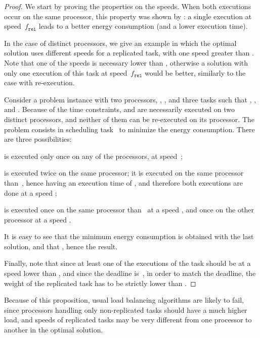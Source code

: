\documentclass[a4paper]{article}
\theoremstyle{plain}
\theoremstyle{definition}
\theoremstyle{remark}
\newcommand{\fr}{\ensuremath{f_{\texttt{rel}}}\xspace}
\begin{document}
\begin{proof}
  We start by proving the properties on the speeds.  
  When both executions occur on the same processor, this property was
  shown by \cite{rr7757}: a single execution at speed~\fr leads to a
  better energy consumption (and a lower execution time). 

  In the case of distinct processors, we give an example in which
  the optimal solution uses different speeds for a replicated task,
  with one speed greater than . Note that one
  of the speeds is necessary lower than ,
  otherwise a solution with only one execution of this task at
  speed~\fr would be better, similarly to the case with re-execution. 

  Consider a problem instance with two processors, ,
  , and three tasks such that , ,
  and .  Because of the time constraints,  and  are
  necessarily executed on two distinct processors, and neither of
  them can be re-executed on its processor.  The problem consists in
  scheduling task~ to minimize the energy consumption. There are
  three possibilities: 
\begin{compactitem}
\item  is executed only once on any of the processors, at
  speed~; 
\item  is executed twice on the same processor; it is executed on
  the same processor than~, hence having an execution time of
  , and therefore both
  executions are done at a speed ; 
\item  is executed once on the same processor than~ at
      a speed , and once on the other processor at
      a speed . 
\end{compactitem} 
It is easy to see that the minimum energy consumption is obtained with
the last solution, and that , hence the result.  

Finally, note that since at least one of the executions of the task
should be at a speed lower than , and since the
deadline is~, in order to match the deadline, the weight of the
replicated task has to be strictly lower than
. 
\end{proof}

Because of this proposition, usual load balancing algorithms are
likely to fail, since processors handling only non-replicated tasks
should have a much higher load, and speeds of replicated tasks may be
very different from one processor to another in the optimal solution. 
\end{document}
